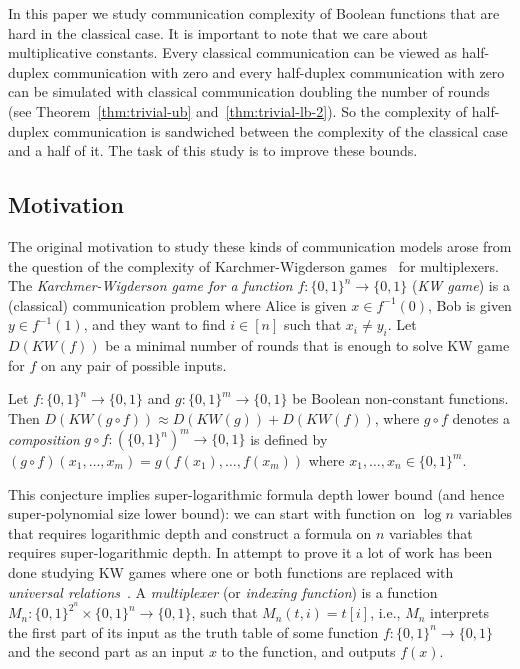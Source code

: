 In this paper we study communication complexity of Boolean functions that are hard in the classical case. It is important to note that we care about multiplicative constants. Every classical communication can be viewed as half-duplex communication with zero and every half-duplex communication with zero can be simulated with classical communication doubling the number of rounds (see Theorem~\ref{thm:trivial-ub} and~\ref{thm:trivial-lb-2}). 
So the complexity of half-duplex communication is sandwiched between the complexity of the classical case and a half of it. The task of this study is to improve these bounds.

\subsection{Motivation}
The original motivation to study these kinds of communication models arose from the question of the
complexity of Karchmer-Wigderson games~\cite{KW88} for multiplexers. The \emph{Karchmer-Wigderson game
for a function} $f:\{0,1\}^n\to \{0,1\}$ (\emph{KW game}) is a (classical) communication problem where Alice is given
$x\in f^{-1}(0)$, Bob is given $y\in f^{-1}(1)$, and they want to find $i\in[n]$ such that $x_i\neq
y_i$. Let $D(KW(f))$ be a minimal number of rounds that is enough to solve KW game for $f$ on any pair of possible inputs.
\begin{conjecture}
Let $f:\{0,1\}^n\to\{0,1\}$ and $g:\{0,1\}^m\to\{0,1\}$ be Boolean non-constant functions.
Then $D(KW(g\circ f))\approx D(KW(g)) + D(KW(f))$, where $g\circ f$ denotes a \emph{composition} $g\circ f : (\{0,1\}^n)^m\to\{0,1\}$ is defined by
\(
	(g\circ f)(x_1,\dotsc,x_m) = g(f(x_1),\dotsc, f(x_m))
\)
where $x_1,\dotsc,x_n\in\{0,1\}^m$.
\end{conjecture}
This conjecture implies super-logarithmic formula depth lower bound (and hence super-polynomial size lower bound): we can start with function on $\log n$ variables
that requires logarithmic depth and construct a formula on $n$ variables that requires
super-logarithmic depth.
In attempt to prove it a lot of work has been done studying KW games where one or both functions are replaced with \emph{universal relations}~\cite{HW90, EIRS01, GMWW17}. A \emph{multiplexer} (or \emph{indexing function}) is a function $M_n:\{0,1\}^{2^n}\times
\{0,1\}^n\to\{0,1\}$, such that $M_n(t,i) = t[i]$, i.e., $M_n$ interprets the first part of its input
as the truth table of some function $f:\{0,1\}^n\to\{0,1\}$ and the second part as an input $x$ to the function, and outputs $f(x)$. 
